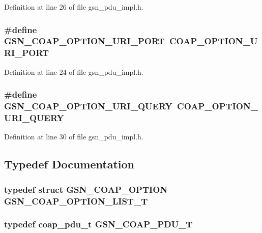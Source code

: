 Definition at line 26 of file gsn\_\-pdu\_\-impl.h.

\hypertarget{a00538_adbd1e23ca1ccd52a765b85ec4aa4e102}{
\subsubsection[{GSN\_\-COAP\_\-OPTION\_\-URI\_\-PORT}]{\setlength{\rightskip}{0pt plus 5cm}\#define GSN\_\-COAP\_\-OPTION\_\-URI\_\-PORT~COAP\_\-OPTION\_\-URI\_\-PORT}}
\label{a00538_adbd1e23ca1ccd52a765b85ec4aa4e102}


Definition at line 24 of file gsn\_\-pdu\_\-impl.h.

\hypertarget{a00538_a36e6d48e2ecaa5b40e85f923196abadc}{
\subsubsection[{GSN\_\-COAP\_\-OPTION\_\-URI\_\-QUERY}]{\setlength{\rightskip}{0pt plus 5cm}\#define GSN\_\-COAP\_\-OPTION\_\-URI\_\-QUERY~COAP\_\-OPTION\_\-URI\_\-QUERY}}
\label{a00538_a36e6d48e2ecaa5b40e85f923196abadc}


Definition at line 30 of file gsn\_\-pdu\_\-impl.h.



\subsection{Typedef Documentation}
\hypertarget{a00538_ad50259914e24245b799f66caf5819d83}{
\subsubsection[{GSN\_\-COAP\_\-OPTION\_\-LIST\_\-T}]{\setlength{\rightskip}{0pt plus 5cm}typedef struct {\bf GSN\_\-COAP\_\-OPTION}  {\bf GSN\_\-COAP\_\-OPTION\_\-LIST\_\-T}}}
\label{a00538_ad50259914e24245b799f66caf5819d83}
\hypertarget{a00538_afde87a99bfaad4a8beac3df27a309976}{
\subsubsection[{GSN\_\-COAP\_\-PDU\_\-T}]{\setlength{\rightskip}{0pt plus 5cm}typedef coap\_\-pdu\_\-t {\bf GSN\_\-COAP\_\-PDU\_\-T}}}
\label{a00538_afde87a99bfaad4a8beac3df27a309976}


